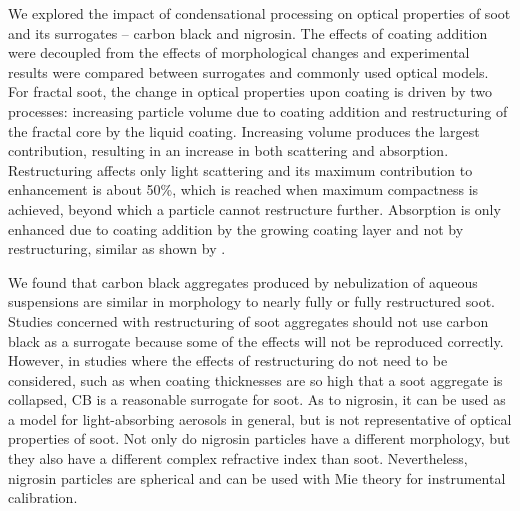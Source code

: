 
We explored the impact of condensational processing on optical properties of soot and its surrogates -- carbon black and nigrosin. The effects of coating addition were decoupled from the effects of morphological changes and experimental results were compared between surrogates and commonly used optical models.
For fractal soot, the change in optical properties upon coating is driven by two processes: increasing particle volume due to coating addition and restructuring of the fractal core by the liquid coating. Increasing volume produces the largest contribution, resulting in an increase in both scattering and absorption. Restructuring affects only light scattering and its maximum contribution to enhancement is about 50\%, which is reached when maximum compactness is achieved, beyond which a particle cannot restructure further. Absorption is only enhanced due to coating addition by the growing coating layer and not by restructuring, similar as shown by \citet{RN67}.


We found that carbon black aggregates produced by nebulization of aqueous suspensions are similar in morphology to nearly fully or fully restructured soot. Studies concerned with restructuring of soot aggregates should not use carbon black as a surrogate because some of the effects will not be reproduced correctly. However, in studies where the effects of restructuring do not need to be considered, such as when coating thicknesses are so high that a soot aggregate is collapsed, CB is a reasonable surrogate for soot. As to nigrosin, it can be used as a model for light-absorbing aerosols in general, but is not representative of optical properties of soot. Not only do nigrosin particles have a different morphology, but they also have a different complex refractive index than soot. Nevertheless, nigrosin particles are spherical and can be used with Mie theory for instrumental calibration.


